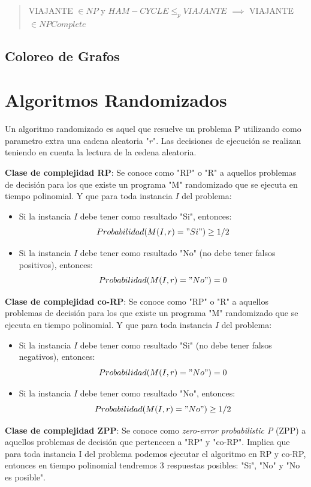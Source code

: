 \documentclass{article}
\begin{document}
\begin{quote}
    VIAJANTE \(\in NP\) y \(HAM-CYCLE \leq_p VIAJANTE\) \(\implies\) VIAJANTE \(\in NPComplete\)
\end{quote}

\newpage
\subsection{Coloreo de Grafos}


\newpage
\section{Algoritmos Randomizados}

Un algoritmo randomizado es aquel que resuelve un problema P utilizando 
como parametro extra una cadena aleatoria "\(r\)". Las decisiones de ejecución
se realizan teniendo en cuenta la lectura de la cedena aleatoria.

\textbf{Clase de complejidad RP}: Se conoce como "RP" o "R" a aquellos problemas de decisión
para los que existe un programa "M" randomizado que se ejecuta en tiempo polinomial. Y que para 
toda instancia \(I\) del problema:
\begin{itemize}
    \item Si la instancia \(I\) debe tener como resultado "Si", entonces:
     \[
         Probabilidad(M(I,r)="Si")\geq 1/2
     \] 
    \item Si la instancia \(I\) debe tener como resultado "No" (no debe tener falsos positivos), entonces:
    \[
        Probabilidad(M(I,r)="No") = 0
    \] 
    
\end{itemize}

\textbf{Clase de complejidad co-RP}: Se conoce como "RP" o "R" a aquellos problemas de decisión
para los que existe un programa "M" randomizado que se ejecuta en tiempo polinomial. Y que para 
toda instancia \(I\) del problema:
\begin{itemize}
    \item Si la instancia \(I\) debe tener como resultado "Si" (no debe tener falsos negativos), entonces:
     \[
         Probabilidad(M(I,r)="No") = 0
     \] 
    \item Si la instancia \(I\) debe tener como resultado "No", entonces:
    \[
        Probabilidad(M(I,r)="No") \geq 1/2
    \]
\end{itemize}

\textbf{Clase de complejidad ZPP}: Se conoce como \textit{zero-error probabilistic P} (ZPP) a aquellos
problemas de decisión que pertenecen a "RP" y "co-RP". Implica que para toda instancia I del problema
podemos ejecutar el algoritmo en RP y co-RP, entonces en tiempo polinomial tendremos 3 respuestas posibles:
"Si", "No" y "No es posible".
\end{document}
